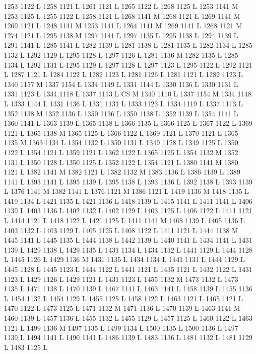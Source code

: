 {{{{{{{{{{{{{{{{{{{{{{{{1253 1122 L
1258 1121 L
1261 1121 L
1265 1122 L
1268 1125 L
1253 1141 M 1253 1125 L
1255 1122 L
1258 1121 L
1268 1141 M 1268 1121 L
1269 1141 M 1269 1121 L
1248 1141 M 1253 1141 L
1264 1141 M 1269 1141 L
1268 1121 M 1274 1121 L
1295 1138 M 1297 1141 L
1297 1135 L
1295 1138 L
1294 1139 L
1291 1141 L
1285 1141 L
1282 1139 L
1281 1138 L
1281 1135 L
1282 1134 L
1285 1132 L
1292 1129 L
1295 1128 L
1297 1126 L
1281 1136 M 1282 1135 L
1285 1134 L
1292 1131 L
1295 1129 L
1297 1128 L
1297 1123 L
1295 1122 L
1292 1121 L
1287 1121 L
1284 1122 L
1282 1123 L
1281 1126 L
1281 1121 L
1282 1123 L
1340 1157 M 1337 1154 L
1334 1149 L
1331 1144 L
1330 1136 L
1330 1131 L
1331 1123 L
1334 1118 L
1337 1113 L
CS M
1340 1110 L
1337 1154 M 1334 1148 L
1333 1144 L
1331 1136 L
1331 1131 L
1333 1123 L
1334 1119 L
1337 1113 L
1352 1138 M 1352 1136 L
1350 1136 L
1350 1138 L
1352 1139 L
1354 1141 L
1360 1141 L
1363 1139 L
1365 1138 L
1366 1135 L
1366 1125 L
1367 1122 L
1369 1121 L
1365 1138 M 1365 1125 L
1366 1122 L
1369 1121 L
1370 1121 L
1365 1135 M 1363 1134 L
1354 1132 L
1350 1131 L
1349 1128 L
1349 1125 L
1350 1122 L
1354 1121 L
1359 1121 L
1362 1122 L
1365 1125 L
1354 1132 M 1352 1131 L
1350 1128 L
1350 1125 L
1352 1122 L
1354 1121 L
1380 1141 M 1380 1121 L
1382 1141 M 1382 1121 L
1382 1132 M 1383 1136 L
1386 1139 L
1389 1141 L
1393 1141 L
1395 1139 L
1395 1138 L
1393 1136 L
1392 1138 L
1393 1139 L
1376 1141 M 1382 1141 L
1376 1121 M 1386 1121 L
1419 1136 M 1418 1135 L
1419 1134 L
1421 1135 L
1421 1136 L
1418 1139 L
1415 1141 L
1411 1141 L
1406 1139 L
1403 1136 L
1402 1132 L
1402 1129 L
1403 1125 L
1406 1122 L
1411 1121 L
1414 1121 L
1418 1122 L
1421 1125 L
1411 1141 M 1408 1139 L
1405 1136 L
1403 1132 L
1403 1129 L
1405 1125 L
1408 1122 L
1411 1121 L
1444 1138 M 1445 1141 L
1445 1135 L
1444 1138 L
1442 1139 L
1440 1141 L
1434 1141 L
1431 1139 L
1429 1138 L
1429 1135 L
1431 1134 L
1434 1132 L
1441 1129 L
1444 1128 L
1445 1126 L
1429 1136 M 1431 1135 L
1434 1134 L
1441 1131 L
1444 1129 L
1445 1128 L
1445 1123 L
1444 1122 L
1441 1121 L
1435 1121 L
1432 1122 L
1431 1123 L
1429 1126 L
1429 1121 L
1431 1123 L
1455 1132 M 1473 1132 L
1473 1135 L
1471 1138 L
1470 1139 L
1467 1141 L
1463 1141 L
1458 1139 L
1455 1136 L
1454 1132 L
1454 1129 L
1455 1125 L
1458 1122 L
1463 1121 L
1465 1121 L
1470 1122 L
1473 1125 L
1471 1132 M 1471 1136 L
1470 1139 L
1463 1141 M 1460 1139 L
1457 1136 L
1455 1132 L
1455 1129 L
1457 1125 L
1460 1122 L
1463 1121 L
1499 1136 M 1497 1135 L
1499 1134 L
1500 1135 L
1500 1136 L
1497 1139 L
1494 1141 L
1490 1141 L
1486 1139 L
1483 1136 L
1481 1132 L
1481 1129 L
1483 1125 L
}}}}}}}}}}}}}}}}}}}}}}}}
